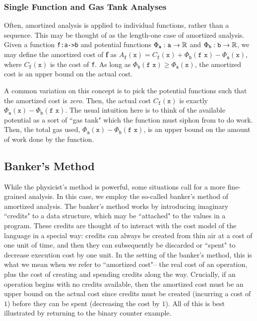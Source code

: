 \subsubsection{Single Function and Gas Tank Analyses}
Often, amortized analysis is applied to individual functions, rather than a sequence. This may be thought of as the length-one case of amortized analysis.
Given a function \texttt{f:a->b} and potential functions $\Phi_\texttt{a} : \texttt{a} \to \mathbb{R}$ and $\Phi_\texttt{b} : \texttt{b} \to \mathbb{R}$, we may define
the amortized cost of \textbf{f} as $A_\texttt{f}(\texttt{x}) = C_\texttt{f}(\texttt{x}) + \Phi_\texttt{b}(\texttt{f x}) - \Phi_\texttt{a}(\texttt{x})$,
where $C_\texttt{f}(\texttt{x})$ is the cost of \texttt{f}. As long as $\Phi_\texttt{b}(\texttt{f x}) \geq \Phi_\texttt{a}(\texttt{x})$, the amortized cost is an upper bound on the actual cost.

A common variation on this concept is to pick the potential functions such that the amortized cost is \textit{zero}. Then, the actual cost $C_\texttt{f}(\texttt{x})$ is exactly $\Phi_\texttt{a}(\texttt{x}) - \Phi_\texttt{b}(\texttt{f x})$. The usual intuition here is to think of the available potential as a sort of ``gas tank" which the function must siphon from to do work. Then, the total gas used, $\Phi_\texttt{a}(\texttt{x}) - \Phi_\texttt{b}(\texttt{f x})$, is an upper bound on the amount of work done by the function.


\subsection{Banker's Method}
While the physicist's method is powerful, some situations call for a more fine-grained analysis. In this case, we employ the so-called banker's method of amortized analysis. The banker's method works by introducing imaginary ``credits" to a data structure, which may be ``attached" to the values in a program. These credits are thought of to interact with the cost model of the language in a special way: credits can always be created from thin air at a cost of one unit of time, and then they can subsequently be discarded or ``spent" to decrease execution cost by one unit. In the setting of the banker's method, this is what we mean when we refer to ``amortized cost"-- the real cost of an operation, plus the cost of creating and spending credits along the way. Crucially, if an operation begins with no credits available, then the amortized cost must be an upper bound on the actual cost since credits must be created (incurring a cost of $1$) before they can be spent (decreasing the cost by $1$). All of this is best illustrated by returning to the binary counter example.

